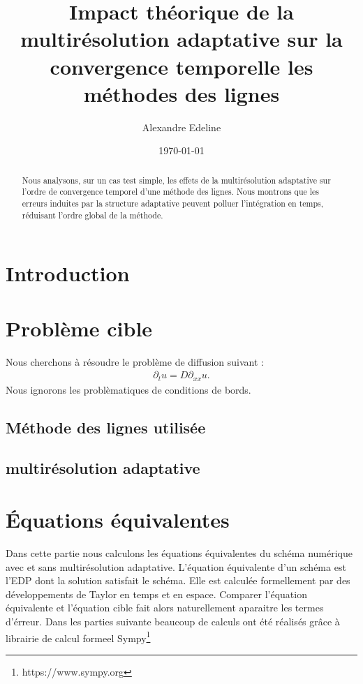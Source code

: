 \documentclass[11pt]{article}
\title{Impact théorique de la multirésolution adaptative sur la convergence temporelle les méthodes des lignes}
\author{Alexandre Edeline}%
\date{\today}
\theoremstyle{definition}
\theoremstyle{remark}
\newcommand{\dt}[1]{\partial_t #1}
\newcommand{\dxx}[1]{\partial_{xx} #1}
\begin{document}
\maketitle

\begin{abstract}
Nous analysons, sur un cas test simple, les effets de la multirésolution adaptative sur l'ordre de convergence temporel d'une méthode des lignes. Nous montrons que les erreurs induites par la structure adaptative peuvent polluer l'intégration en temps, réduisant l'ordre global de la méthode.
\end{abstract}

\section{Introduction}
    
\newpage
\section{Problème cible}
    Nous cherchons à résoudre le problème de diffusion suivant :
    \begin{align}
        \dt{u} = D \dxx{u}.
    \end{align}
    Nous ignorons les problèmatiques de conditions de bords.
        \subsection{Méthode des lignes utilisée}
            
        \subsection{multirésolution adaptative}
            
\newpage
\section{Équations équivalentes}
    Dans cette partie nous calculons les équations équivalentes du schéma numérique avec et sans multirésolution adaptative.
    L'équation équivalente d'un schéma est l'EDP dont la solution satisfait le schéma. Elle est calculée formellement par des développements de Taylor en temps et en espace.
    Comparer l'équation équivalente et l'équation cible fait alors naturellement aparaitre les termes d'érreur. 
    Dans les parties suivante beaucoup de calculs ont été réalisés grâce à librairie de calcul formeel Sympy\footnote{https://www.sympy.org}
    
\end{document}
